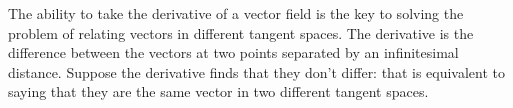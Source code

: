 The ability to take the derivative of a vector field is the key to solving the problem of relating vectors in different tangent spaces. The derivative is the difference between the vectors at two points separated by an infinitesimal distance. Suppose the derivative finds that they don't differ: that is equivalent to saying that they are the same vector in two different tangent spaces.
